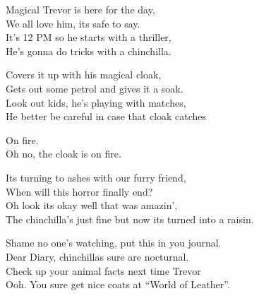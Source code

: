 \vspace{10pt}
Magical Trevor is here for the day,\\
We all love him, its safe to say.\\
It's 12 PM so he starts with a thriller,\\
He's gonna do tricks with a chinchilla.\par
\vspace{10pt}
Covers it up with his magical cloak,\\
Gets out some petrol and gives it a soak.\\
Look out kids, he's playing with matches,\\
He better be careful in case that cloak catches\par
\vspace{10pt}
On fire.\\
Oh no, the cloak is on fire.\par
\vspace{10pt}
Its turning to ashes with our furry friend,\\
When will this horror finally end?\\
Oh look its okay well that was amazin',\\
The chinchilla's just fine but now its turned into a raisin.\par
\vspace{10pt}
Shame no one's watching, put this in you journal.\\
Dear Diary, chinchillas sure are nocturnal.\\
Check up your animal facts next time Trevor\\
Ooh. You sure get nice coats at ``World of Leather''.
